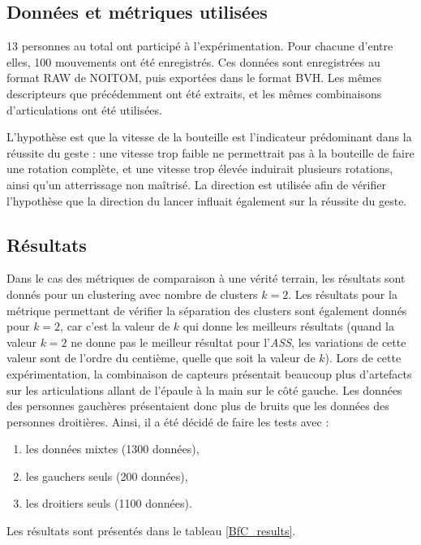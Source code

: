 \subsection{Données et métriques utilisées}
13 personnes au total ont participé à l'expérimentation. Pour chacune d'entre elles, 100 mouvements ont été enregistrés. Ces données sont enregistrées au format RAW de NOITOM, puis exportées dans le format BVH. Les mêmes descripteurs que précédemment ont été extraits, et les mêmes combinaisons d'articulations ont été utilisées.

L'hypothèse est que la vitesse de la bouteille est l'indicateur prédominant dans la réussite du geste : une vitesse trop faible ne permettrait pas à la bouteille de faire une rotation complète, et une vitesse trop élevée induirait plusieurs rotations, ainsi qu'un atterrissage non maîtrisé. La direction est utilisée afin de vérifier l'hypothèse que la direction du lancer influait également sur la réussite du geste.

\subsection{Résultats}
Dans le cas des métriques de comparaison à une vérité terrain, les résultats sont donnés pour un clustering avec nombre de clusters $k = 2$. Les résultats pour la métrique permettant de vérifier la séparation des clusters sont également donnés pour $k = 2$, car c'est la valeur de $k$ qui donne les meilleurs résultats (quand la valeur $k = 2$ ne donne pas le meilleur résultat pour l'\textit{ASS}, les variations de cette valeur sont de l'ordre du centième, quelle que soit la valeur de $k$). Lors de cette expérimentation, la combinaison de capteurs présentait beaucoup plus d'artefacts sur les articulations allant de l'épaule à la main sur le côté gauche. Les données des personnes gauchères présentaient donc plus de bruits que les données des personnes droitières. Ainsi, il a été décidé de faire les tests avec :

\begin{enumerate}[label=(\roman*)]
	\item les données mixtes (1300 données),
	\item les gauchers seuls (200 données),
	\item les droitiers seuls (1100 données).
\end{enumerate}

Les résultats sont présentés dans le tableau \ref{BfC_results}.

